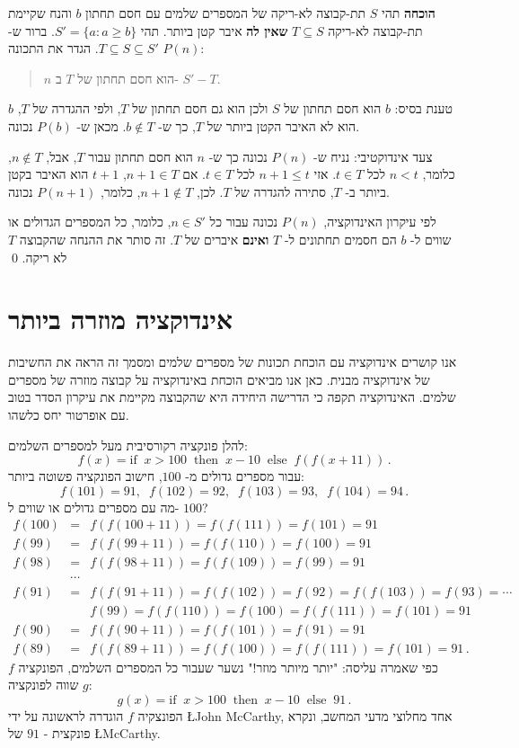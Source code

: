 \textbf{הוכחה} 
תהי
$S$
תת-קבוצה לא-ריקה של המספרים שלמים עם חסם תחתון 
$b$
והנח שקיימת תת-קבוצה לא-ריקה
$T\subseteq S$
\textbf{שאין לה}
איבר קטן ביותר. תהי
$S'=\{a:a\geq b\}$.
ברור ש-%
$T\subseteq S \subseteq S'$.
הגדר את התכונה
$P(n)$:
\begin{quote}
$n$
הוא חסם תחתון של
$T$
ב-%
$S'-T$.
\end{quote}
טענת בסיס: 
$b$
הוא חסם תחתון של
$S$
ולכן הוא גם חסם תחתון של
$T$,
ולפי ההגדרה של
$T$, $b$
הוא לא האיבר הקטן ביותר של
$T$,
כך ש-%
$b\not\in T$.
מכאן ש-%
$P(b)$
נכונה.

צעד אינדוקטיבי: נניח ש-%
$P(n)$
נכונה כך ש-%
$n$
הוא חסם תחתון עבור 
$T$, 
אבל,
$n\not\in T$,
כלומר,
$n<t$
לכל
$t\in T$.
אזי
$n+1\leq t$
לכל
$t \in T$.
אם
$n+1\in T$, $t+1$
הוא האיבר בקטן ביותר ב-%
$T$,
סתירה להגדרה של
$T$.
לכן,
$n+1\not\in T$,
כלומר,
$P(n+1)$
נכונה.

לפי עיקרון האינדוקציה,
$P(n)$
נכונה עבור כל
$n\in S'$,
כלומר, כל המספרים הגדולים או שווים ל-%
$b$
הם חסמים תחתונים ל-%
$T$
\textbf{ואינם}
איברים של
$T$.
זה סותר את ההנחה שהקבוצה 
$T$
לא ריקה.
\qed



\section{%
אינדוקציה מוזרה ביותר%
}

אנו קושרים אינדוקציה עם הוכחת תכונות של מספרים שלמים ומסמך זה הראה את החשיבות של אינדוקציה מבנית. כאן אנו מביאים הוכחת באינדוקציה על קבוצה מוזרה של מספרים שלמים. האינדוקציה תקפה כי הדרישה היחידה היא שהקבוצה מקיימת את עיקרון הסדר בטוב עם אופרטור יחס כלשהו.

להלן פונקציה רקורסיבית מעל למספרים השלמים:
\[
f(x) = \textrm{if}\;\; x > 100 \;\;\textrm{then}\;\; x - 10 \;\;\textrm{else}\;\; f(f(x+11))\,.
\]
עבור מספרים גדולים מ-
$100$,
חישוב הפונקציה פשוטה ביותר:
\[
f(101) = 91, \;\; f(102) = 92,\;\; f(103) = 93,\;\; f(104) = 94\,.
\]
מה עם מספרים גדולים או שווים ל-%
$100$?
\begin{eqnarray*}
f(100) &=& f(f(100+11)) = f(f(111)) = f(101) = 91\\
f(99) &=& f(f(99+11)) = f(f(110)) = f(100) = 91\\
f(98) &=& f(f(98+11)) = f(f(109)) = f(99) = 91\\
&\cdots&\\
f(91) &=& f(f(91+11)) = f(f(102)) = f(92) = f(f(103)) = f(93) = \cdots\\
&&f(99) = f(f(110)) = f(100) = f(f(111)) = f(101) = 91\\
f(90) &=& f(f(90+11)) = f(f(101)) = f(91) = 91\\
f(89) &=& f(f(89+11)) = f(f(100)) = f(f(111)) = f(101) = 91\,.
\end{eqnarray*}
כפי שאמרה עליסה: "יותר מיותר מוזר!" נשער שעבור כל המספרים השלמים, הפונקציה
$f$
שווה לפונקציה
$g$:
\[
g(x) = \textrm{if}\;\; x > 100 \;\;\textrm{then}\;\; x - 10 \;\;\textrm{else}\;\; 91\,.
\]
הפונצקיה
$f$
הוגדרה לראשונה על ידי
\L{John McCarthy},
אחד מחלוצי מדעי המחשב, ונקרא פונקצית -%
$91$
של
\L{McCarthy}.

